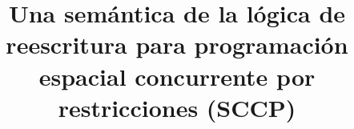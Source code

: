 \title{Una sem\'antica de la l\'ogica de reescritura para programaci\'on espacial concurrente por restricciones (SCCP)}




